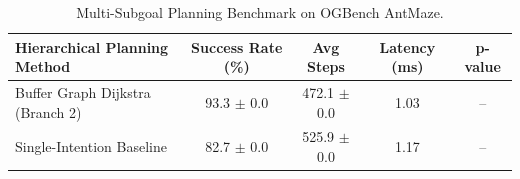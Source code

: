 \begin{table}[htbp]
\centering
\small
\begin{tabular}{lcccc}
\toprule
\textbf{Hierarchical Planning Method} & \textbf{Success Rate (\%)} & \textbf{Avg Steps} & \textbf{Latency (ms)} & \textbf{p-value} \\
\midrule
Buffer Graph Dijkstra (Branch 2) & 93.3 $\pm$ 0.0 & 472.1 $\pm$ 0.0 & 1.03 & -- \\
Single-Intention Baseline & 82.7 $\pm$ 0.0 & 525.9 $\pm$ 0.0 & 1.17 & -- \\
\bottomrule
\end{tabular}
\caption{Multi-Subgoal Planning Benchmark on OGBench AntMaze.}
\end{table}